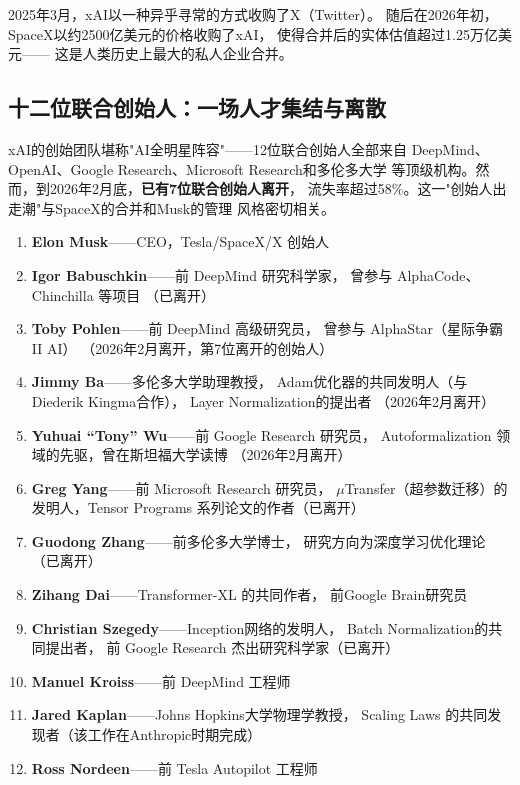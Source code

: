 2025年3月，xAI以一种异乎寻常的方式收购了X（Twitter）。
随后在2026年初，SpaceX以约2500亿美元的价格收购了xAI，
使得合并后的实体估值超过1.25万亿美元——
这是人类历史上最大的私人企业合并。

\subsection{十二位联合创始人：一场人才集结与离散}

xAI的创始团队堪称"AI全明星阵容"——12位联合创始人全部来自
DeepMind、OpenAI、Google Research、Microsoft Research和多伦多大学
等顶级机构。然而，到2026年2月底，\textbf{已有7位联合创始人离开}，
流失率超过58\%。这一"创始人出走潮"与SpaceX的合并和Musk的管理
风格密切相关。

\begin{keybox}
\begin{enumerate}
  \item \textbf{Elon Musk}——CEO，Tesla/SpaceX/X 创始人
  \item \textbf{Igor Babuschkin}——前 DeepMind 研究科学家，
    曾参与 AlphaCode、Chinchilla 等项目
    （已离开）
  \item \textbf{Toby Pohlen}——前 DeepMind 高级研究员，
    曾参与 AlphaStar（星际争霸II AI）
    （2026年2月离开，第7位离开的创始人）
  \item \textbf{Jimmy Ba}——多伦多大学助理教授，
    Adam优化器的共同发明人（与Diederik Kingma合作），
    Layer Normalization的提出者
    （2026年2月离开）
  \item \textbf{Yuhuai ``Tony'' Wu}——前 Google Research 研究员，
    Autoformalization 领域的先驱，曾在斯坦福大学读博
    （2026年2月离开）
  \item \textbf{Greg Yang}——前 Microsoft Research 研究员，
    $\mu$Transfer（超参数迁移）的发明人，Tensor Programs
    系列论文的作者（已离开）
  \item \textbf{Guodong Zhang}——前多伦多大学博士，
    研究方向为深度学习优化理论（已离开）
  \item \textbf{Zihang Dai}——Transformer-XL 的共同作者，
    前Google Brain研究员
  \item \textbf{Christian Szegedy}——Inception网络的发明人，
    Batch Normalization的共同提出者，
    前 Google Research 杰出研究科学家（已离开）
  \item \textbf{Manuel Kroiss}——前 DeepMind 工程师
  \item \textbf{Jared Kaplan}——Johns Hopkins大学物理学教授，
    Scaling Laws 的共同发现者（该工作在Anthropic时期完成）
  \item \textbf{Ross Nordeen}——前 Tesla Autopilot 工程师
\end{enumerate}
\end{keybox}

